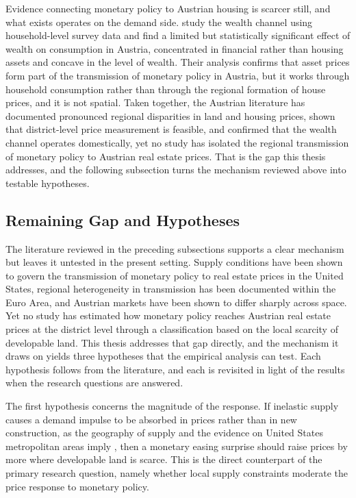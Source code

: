 \documentclass[a4paper,12pt, headsepline]{scrartcl}
\numberwithin{equation}{section}
\begin{document}
Evidence connecting monetary policy to Austrian housing is scarcer still, and what exists operates on the demand side. \citet{albacete2017} study the wealth channel using household-level survey data and find a limited but statistically significant effect of wealth on consumption in Austria, concentrated in financial rather than housing assets and concave in the level of wealth. Their analysis confirms that asset prices form part of the transmission of monetary policy in Austria, but it works through household consumption rather than through the regional formation of house prices, and it is not spatial. Taken together, the Austrian literature has documented pronounced regional disparities in land and housing prices, shown that district-level price measurement is feasible, and confirmed that the wealth channel operates domestically, yet no study has isolated the regional transmission of monetary policy to Austrian real estate prices. That is the gap this thesis addresses, and the following subsection turns the mechanism reviewed above into testable hypotheses.

\subsection{Remaining Gap and Hypotheses}\label{subsec:hypotheses}

The literature reviewed in the preceding subsections supports a clear mechanism but leaves it untested in the present setting. Supply conditions have been shown to govern the transmission of monetary policy to real estate prices in the United States, regional heterogeneity in transmission has been documented within the Euro Area, and Austrian markets have been shown to differ sharply across space. Yet no study has estimated how monetary policy reaches Austrian real estate prices at the district level through a classification based on the local scarcity of developable land. This thesis addresses that gap directly, and the mechanism it draws on yields three hypotheses that the empirical analysis can test. Each hypothesis follows from the literature, and each is revisited in light of the results when the research questions are answered.

The first hypothesis concerns the magnitude of the response. If inelastic supply causes a demand impulse to be absorbed in prices rather than in new construction, as the geography of supply and the evidence on United States metropolitan areas imply \citep{saiz2010, aastveit2022}, then a monetary easing surprise should raise prices by more where developable land is scarce. This is the direct counterpart of the primary research question, namely whether local supply constraints moderate the price response to monetary policy.
\end{document}

